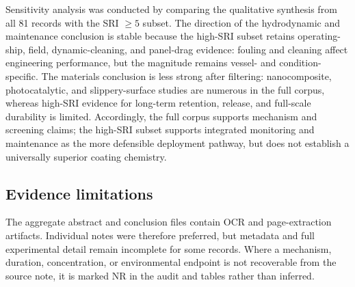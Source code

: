 Sensitivity analysis was conducted by comparing the qualitative synthesis from all 81 records with the SRI $\geq5$ subset. The direction of the hydrodynamic and maintenance conclusion is stable because the high-SRI subset retains operating-ship, field, dynamic-cleaning, and panel-drag evidence: fouling and cleaning affect engineering performance, but the magnitude remains vessel- and condition-specific. The materials conclusion is less strong after filtering: nanocomposite, photocatalytic, and slippery-surface studies are numerous in the full corpus, whereas high-SRI evidence for long-term retention, release, and full-scale durability is limited. Accordingly, the full corpus supports mechanism and screening claims; the high-SRI subset supports integrated monitoring and maintenance as the more defensible deployment pathway, but does not establish a universally superior coating chemistry.

\subsection{Evidence limitations}
The aggregate abstract and conclusion files contain OCR and page-extraction artifacts. Individual notes were therefore preferred, but metadata and full experimental detail remain incomplete for some records. Where a mechanism, duration, concentration, or environmental endpoint is not recoverable from the source note, it is marked NR in the audit and tables rather than inferred.
